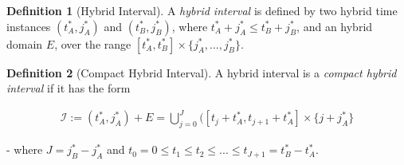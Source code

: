 \documentclass{article}
\theoremstyle{definition}
\newtheorem{definition}{Definition}[section]
\begin{document}
\begin{definition}[Hybrid Interval] A \textit{hybrid interval} is defined by
    two hybrid time instances $(t^*_A,j^*_A)$ and $(t^*_B,j^*_B)$, where
    $t^*_A + j^*_A \leq t^*_B + j^*_B$, and an hybrid domain $E$, over the
    range $[t^*_A, t^*_B]\times\{j^*_A,..., j^*_B\}$.
\end{definition}

\begin{definition}[Compact Hybrid Interval] A hybrid interval is a \textit{compact hybrid
    interval} if it has the form

\begin{gather}
    \mathcal{I}:= (t^*_A,j^*_A) + E = \bigcup\limits_{j=0}^{J} ([t_j + t^*_A,t_{j+1} + t^*_A] \times \{j + j^*_A\}
\end{gather}

- where $J = j^*_B - j^*_A$ and $t_0 = 0 \leq t_1 \leq t_2 \leq ... \leq t_{J+1} =
t^*_B - t^*_A$.
\end{definition}
\end{document}
